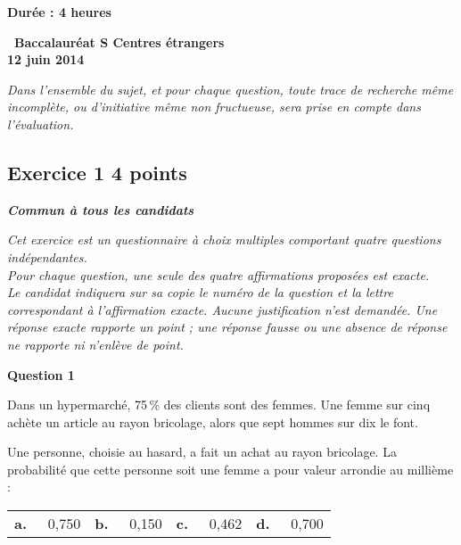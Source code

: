 \documentclass[10pt]{article}
\begin{document}

\begin{center}\textbf{Durée  : 4 heures }

\vspace{0,25cm}

{\Large\textbf{\decofourleft~Baccalauréat S Centres étrangers
~\decofourright\\12 juin 2014}}
\end{center}

\vspace{0,25cm}

\emph{Dans l'ensemble du sujet, et pour chaque question, toute trace de recherche même incomplète, ou d'initiative même non fructueuse, sera prise en compte dans l'évaluation.}

\subsection*{Exercice 1 \hfill 4 points}

\textbf{\emph{Commun à tous les candidats}}

\medskip

\emph{Cet exercice est un questionnaire à choix multiples comportant quatre questions indépendantes.\\ Pour chaque question, une seule des quatre affirmations proposées est exacte.\\ 
Le candidat indiquera sur sa copie le numéro de la question et la lettre correspondant à l'affirmation exacte. Aucune justification n'est demandée. Une réponse exacte rapporte un point ; une réponse fausse ou une absence de réponse ne rapporte ni n'enlève de point.}

\medskip
 
\textbf{Question 1}
 
Dans un hypermarché, 75\,\% des clients sont des femmes. Une femme sur cinq achète un article au rayon bricolage, alors que sept hommes sur dix le font.
 
Une personne, choisie au hasard, a fait un achat au rayon bricolage. 
La probabilité que cette personne soit une femme a pour valeur arrondie au millième :

\medskip
\begin{tabularx} {\linewidth}{*{4}{X}}
\textbf{a.~~} 0,750& \textbf{b.~~} 0,150& \textbf{c.~~} 0,462& \textbf{d.~~} 0,700 
\end{tabularx}
\medskip
\end{document}
